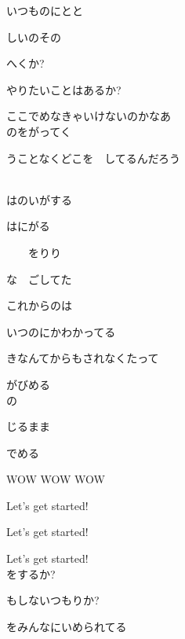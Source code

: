 いつものにとと

しいのその

へくか?

やりたいことはあるか?

ここでめなきゃいけないのかなあ
\\

のをがってく

うことなくどこを　してるんだろう

\\

はのいがする

はにがる

　　をりり

な　ごしてた

これからのは

いつのにかわかってる

きなんてからもされなくたって

がびめる
\\

の

じるまま

でめる

WOW WOW WOW

Let's get started!

Let's get started!

Let's get started!
\\

をするか?

もしないつもりか?

をみんなにいめられてる
\\

